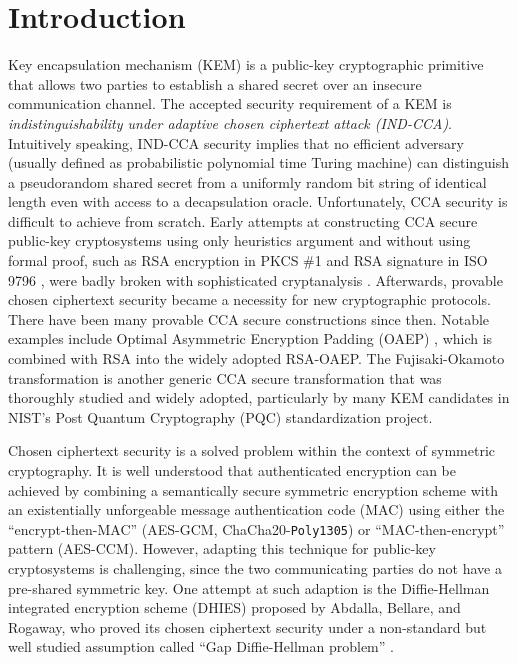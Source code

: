 \documentclass[runningheads]{llncs}
\begin{document}
\section{Introduction}\label{sec:introduction}
Key encapsulation mechanism (KEM) is a public-key cryptographic primitive that allows two parties to establish a shared secret over an insecure communication channel. The accepted security requirement of a KEM is \textit{indistinguishability under adaptive chosen ciphertext attack (IND-CCA)}. Intuitively speaking, IND-CCA security implies that no efficient adversary (usually defined as probabilistic polynomial time Turing machine) can distinguish a pseudorandom shared secret from a uniformly random bit string of identical length even with access to a decapsulation oracle. Unfortunately, CCA security is difficult to achieve from scratch. Early attempts at constructing CCA secure public-key cryptosystems using only heuristics argument and without using formal proof, such as RSA encryption in PKCS \#1 \cite{DBLP:journals/rfc/rfc2313} and RSA signature in ISO 9796 \cite{ISO9796-1}, were badly broken with sophisticated cryptanalysis \cite{DBLP:conf/crypto/Bleichenbacher98,DBLP:conf/eurocrypt/Grieu00,DBLP:conf/crypto/CoronNS99}. Afterwards, provable chosen ciphertext security became a necessity for new cryptographic protocols. There have been many provable CCA secure constructions since then. Notable examples include Optimal Asymmetric Encryption Padding (OAEP) \cite{DBLP:conf/eurocrypt/BellareR94}, which is combined with RSA \cite{DBLP:conf/crypto/FujisakiOPS01} into the widely adopted RSA-OAEP. The Fujisaki-Okamoto transformation \cite{DBLP:conf/crypto/FujisakiO99,DBLP:conf/tcc/HofheinzHK17} is another generic CCA secure transformation that was thoroughly studied and widely adopted, particularly by many KEM candidates in NIST's Post Quantum Cryptography (PQC) standardization project.

Chosen ciphertext security is a solved problem within the context of symmetric cryptography. It is well understood that authenticated encryption can be achieved by combining a semantically secure symmetric encryption scheme with an existentially unforgeable message authentication code (MAC) using either the ``encrypt-then-MAC'' (AES-GCM, ChaCha20-\texttt{Poly1305}) or ``MAC-then-encrypt'' pattern (AES-CCM)\cite{DBLP:conf/asiacrypt/BellareN00,DBLP:conf/crypto/Krawczyk01}. However, adapting this technique for public-key cryptosystems is challenging, since the two communicating parties do not have a pre-shared symmetric key. One attempt at such adaption is the Diffie-Hellman integrated encryption scheme (DHIES) \cite{DBLP:journals/iacr/AbdallaBR99,DBLP:conf/ctrsa/AbdallaBR01} proposed by Abdalla, Bellare, and Rogaway, who proved its chosen ciphertext security under a non-standard but well studied assumption called ``Gap Diffie-Hellman problem'' \cite{DBLP:conf/pkc/OkamotoP01}.
\end{document}
